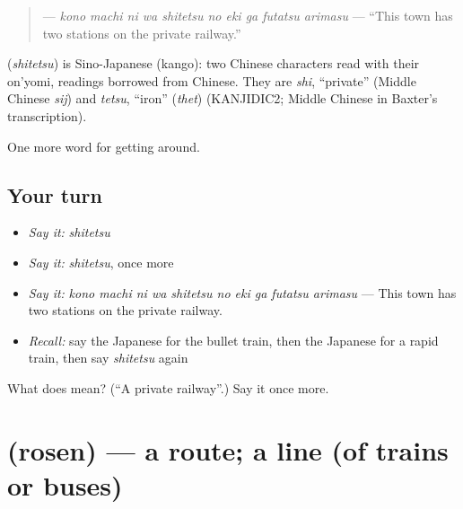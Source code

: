 \begin{quote}
\textbf{     } — \emph{kono machi ni wa shitetsu no eki ga futatsu arimasu} — \textquotedblleft{}This town has two stations on the private railway.\textquotedblright{}
\end{quote}

\begin{cousinweb}
\textbf{} (\emph{shitetsu}) is Sino-Japanese (kango): two Chinese characters read with their on'yomi, readings borrowed from Chinese. They are \emph{shi}, \textquotedblleft{}private\textquotedblright{} (Middle Chinese \emph{sij}) and \emph{tetsu}, \textquotedblleft{}iron\textquotedblright{} (\emph{thet}) (KANJIDIC2; Middle Chinese in Baxter's transcription).
\end{cousinweb}

\begin{grammarlens}[title={What you've built}]
One more word for getting around.
\end{grammarlens}

\subsection*{Your turn}
\begin{itemize}
\raggedright
  \item \emph{Say it:} \emph{shitetsu}
  \item \emph{Say it:} \emph{shitetsu}, once more
  \item \emph{Say it:} \emph{kono machi ni wa shitetsu no eki ga futatsu arimasu} — This town has two stations on the private railway.
  \item \emph{Recall:} say the Japanese for the bullet train, then the Japanese for a rapid train, then say \emph{shitetsu} again
\end{itemize}

\begin{tcolorbox}[breakable,colback=teal!4,colframe=teal!35!black,title={Before you move on}]
What does  mean? (\textquotedblleft{}A private railway\textquotedblright{}.) Say it once more.
\end{tcolorbox}
\section[\texorpdfstring{\ja{ろせん} (rosen)}{ろせん (rosen)}]{ (rosen) — a route; a line (of trains or buses)}

